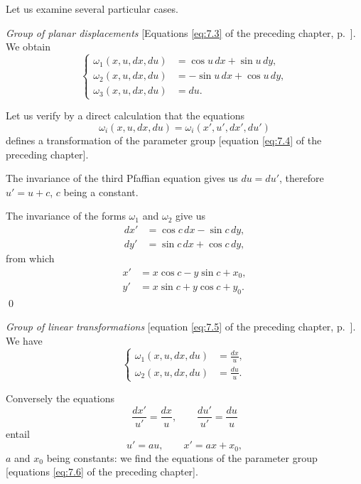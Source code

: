 {\small

Let us examine several particular cases.

\somespace

\emph{Group of planar displacements} [Equations \eqref{eq:7.3} of the preceding chapter, p.~\pageref{eq:7.3}]. We obtain
\begin{equation}
  \label{eq:8.7}
  \left\{
    \begin{aligned}
      \omega_{1}(x,u,dx,du)&=\cos u\,dx+\sin u\,dy,\\
      \omega_{2}(x,u,dx,du)&=-\sin u\,dx+\cos u\,dy,\\
      \omega_{3}(x,u,dx,du)&=du.
    \end{aligned}
  \right.
\end{equation}

Let us verify by a direct calculation that the equations
\[
\omega_{i}(x,u,dx,du)=\omega_{i}(x',u',dx',du')
\]
defines a transformation of the parameter group [equation \eqref{eq:7.4} of the preceding chapter].

The invariance of the third Pfaffian equation gives us $du=du'$, therefore $u'=u+c$, $c$ being a constant.

The invariance of the forms $\omega_{1}$ and $\omega_{2}$ give us
\begin{align*}
  dx'&=\cos c\,dx-\sin c\,dy,\\
  dy'&=\sin c\,dx+\cos c\,dy,
\end{align*}
from which
\begin{align*}
  x'&=x\cos c-y\sin c+x_{0},\\
  y'&=x\sin c+y\cos c+y_{0}.
\end{align*}
\qed

\somespace

\emph{Group of linear transformations} [equation \eqref{eq:7.5} of the preceding chapter, p.~\pageref{eq:7.5}]. We have
\begin{equation}
  \label{eq:8.8}
  \left\{
    \begin{aligned}
      \omega_{1}(x,u,dx,du)&=\frac{dx}{u},\\
      \omega_{2}(x,u,dx,du)&=\frac{du}{u}.
    \end{aligned}
  \right.
\end{equation}

Conversely the equations
\[
\frac{dx'}{u'}=\frac{dx}{u},\qquad\frac{du'}{u'}=\frac{du}{u}
\]
entail
\[
u'=au,\qquad x'=ax+x_{0},
\]
$a$ and $x_{0}$ being constants: we find the equations of the parameter group [equations \eqref{eq:7.6} of the preceding chapter].

}
